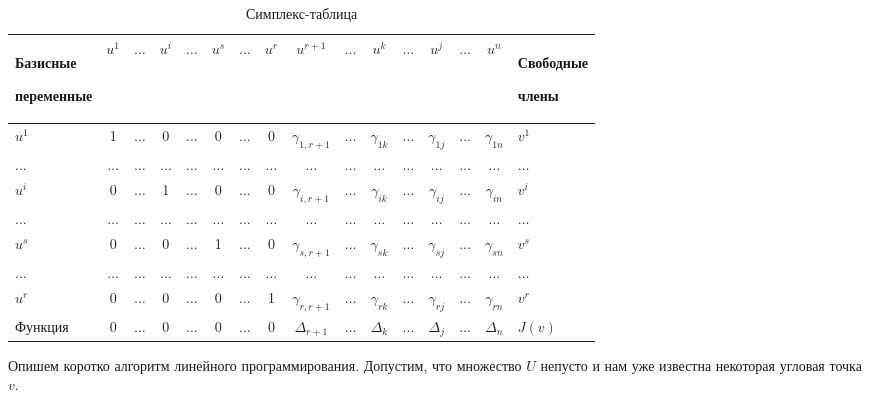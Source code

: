 \documentclass[a4paper, 12pt, titlepage]{article}
\theoremstyle{definition}
\theoremstyle{plain}
\theoremstyle{plain}
\begin{document}
\begin{table}[hh]
\caption{Симплекс-таблица}
\label{simplex-table}
\begin{center}
\begin{tabular}{|p{2cm}|c|c|c|c|c|c|c|c|c|c|c|c|c|c|p{2cm}|}
\hline
Базисные \par переменные & $u^{1}$ & $\ldots$ & $u^{i}$ & $\ldots$ &
$u^{s}$ & $\ldots$ & $u^{r}$ & $u^{r + 1}$ & $\ldots$ & $u^{k}$ & $\ldots$ &
$u^{j}$ & $\ldots$ & $u^{n}$ & Свободные \par члены \\
\hline
$u^{1}$ & 1 & $\ldots$ & 0 & $\ldots$ & 0 & $\ldots$ & 0 & $\gamma_{1, r + 1}$ &
$\ldots$ & $\gamma_{1k}$ & $\ldots$ & $\gamma_{1j}$ & $\ldots$ & $\gamma_{1n}$
& $v^{1}$ \\
$\ldots$ & $\ldots$ & $\ldots$ & $\ldots$ & $\ldots$ & $\ldots$ & $\ldots$ &
$\ldots$ & $\ldots$ & $\ldots$ & $\ldots$ & $\ldots$ & $\ldots$ & $\ldots$ &
$\ldots$ & $\ldots$ \\
$u^{i}$ & 0 & $\ldots$ & 1 & $\ldots$ & 0 & $\ldots$ & 0 & $\gamma_{i, r + 1}$ &
$\ldots$ & $\gamma_{i k}$ & $\ldots$ & $\gamma_{i j}$ & $\ldots$ &
$\gamma_{i n}$ & $v^{i}$ \\
$\ldots$ & $\ldots$ & $\ldots$ & $\ldots$ & $\ldots$ & $\ldots$ & $\ldots$ &
$\ldots$ & $\ldots$ & $\ldots$ & $\ldots$ & $\ldots$ & $\ldots$ & $\ldots$ &
$\ldots$ & $\ldots$ \\
$u^{s}$ & 0 & $\ldots$ & 0 & $\ldots$ & 1 & $\ldots$ & 0 & $\gamma_{s, r + 1}$ &
$\ldots$ & $\gamma_{s k}$ & $\ldots$ & $\gamma_{s j}$ & $\ldots$ &
$\gamma_{s n}$ & $v^{s}$ \\
$\ldots$ & $\ldots$ & $\ldots$ & $\ldots$ & $\ldots$ & $\ldots$ & $\ldots$ &
$\ldots$ & $\ldots$ & $\ldots$ & $\ldots$ & $\ldots$ & $\ldots$ & $\ldots$ &
$\ldots$ & $\ldots$ \\
$u^{r}$ & 0 & $\ldots$ & 0 & $\ldots$ & 0 & $\ldots$ & 1 & $\gamma_{r, r + 1}$ &
$\ldots$ & $\gamma_{r k}$ & $\ldots$ & $\gamma_{r j}$ & $\ldots$ &
$\gamma_{r n}$ & $v^{r}$ \\
\hline
Функция & 0 & $\ldots$ & 0 & $\ldots$ & 0 & $\ldots$ & 0 & $\Delta_{r + 1}$ &
$\ldots$ & $\Delta_{k}$ & $\ldots$ & $\Delta_{j}$ & $\ldots$ & $\Delta_{n}$ &
$J(v)$ \\
\hline
\end{tabular}
\end{center}
\end{table}

Опишем коротко алгоритм линейного программирования. Допустим, что множество $U$
непусто и нам уже известна некоторая угловая точка $v$.
\end{document}
